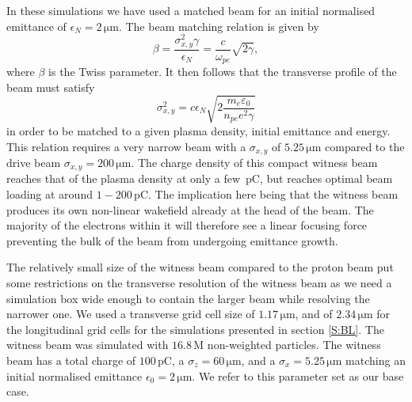 \documentclass[aps,prstab,reprint,amsmath,amssymb,groupedaddress]{revtex4-1}
\newcommand{\unit}[1]{\,\mathrm{#1}}
\begin{document}
In these simulations we have used a matched beam for an initial normalised emittance of $\epsilon_{N} = 2\unit{\mu m}$.
The beam matching relation is given by
\begin{equation}
    \beta = \frac{\sigma_{x,y}^{2}\gamma}{\epsilon_{N}}
          = \frac{c}{\omega_{pe}}\sqrt{2\gamma}, \label{EQ:MatchedB}
\end{equation}
where $\beta$ is the Twiss parameter. It then follows that the transverse profile of the beam must satisfy
\begin{equation}
    \sigma_{x,y}^{2} = c\epsilon_{N}\sqrt{2\frac{m_{e}\varepsilon_{0}}{n_{pe}e^{2}\gamma}} \label{EQ:MatchedR}
\end{equation}
in order to be matched to a given plasma density, initial emittance and energy. This relation requires a very narrow
beam with a $\sigma_{x,y}$ of $5.25\unit{\mu m}$ compared to the drive beam $\sigma_{x,y} = 200\unit{\mu m}$. The charge
density of this compact witness beam reaches that of the plasma density at only a few $\unit{pC}$, but reaches optimal
beam loading at around $1-200\unit{pC}$. The implication here being that the witness beam produces its own non-linear
wakefield already at the head of the beam. The majority of the electrons within it will therefore see a linear focusing
force preventing the bulk of the beam from undergoing emittance growth.

The relatively small size of the witness beam compared to the proton beam put some restrictions on the transverse
resolution of the witness beam as we need a simulation box wide enough to contain the larger beam while resolving the
narrower one. We used a transverse grid cell size of $1.17\unit{\mu m}$, and of $2.34\unit{\mu m}$ for the longitudinal
grid cells for the simulations presented in section \ref{S:BL}. The witness beam was simulated with $16.8\unit{M}$
non-weighted particles. The witness beam has a total charge of $100\unit{pC}$, a $\sigma_{z}=60\unit{\mu m}$, and a
$\sigma_{x}=5.25\unit{\mu m}$ matching an initial normalised emittance $\epsilon_{0} = 2\unit{\mu m}$. We refer to this
parameter set as our base case.
\end{document}
